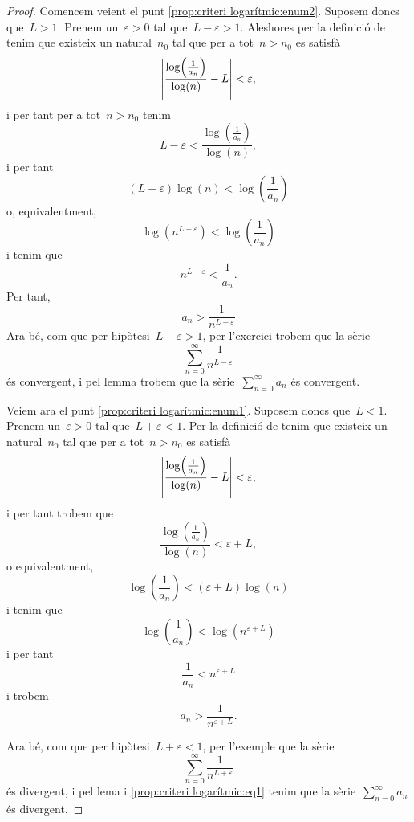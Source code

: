 \documentclass[../../main.tex]{subfiles}
\begin{document}
    \begin{proof}
        Comencem veient el punt \eqref{prop:criteri logarítmic:enum2}.
        Suposem doncs que~\(L>1\).
        Prenem un~\(\varepsilon>0\) tal que~\(L-\varepsilon>1\).
        Aleshores per la definició de  tenim que existeix un natural~\(n_{0}\) tal que per a tot~\(n>n_{0}\) es satisfà
        \[
            \abs{\frac{\log\left(\frac{1}{a_{n}}\right)}{\log(n)}-L}<\varepsilon,
        \]
        i per tant per a tot~\(n>n_{0}\) tenim
        \[
            L-\varepsilon<\frac{\log\left(\frac{1}{a_{n}}\right)}{\log(n)},
        \]
        i per tant
        \[
            (L-\varepsilon)\log(n)<\log\left(\frac{1}{a_{n}}\right)
        \]
        o, equivalentment,
        \[
            \log\left(n^{L-\varepsilon}\right)<\log\left(\frac{1}{a_{n}}\right)
        \]
        i tenim que %
        \[
            n^{L-\varepsilon}<\frac{1}{a_{n}}.
        \]
        Per tant,
        \[
            a_{n}>\frac{1}{n^{L-\varepsilon}}
        \]
        Ara bé, com que per hipòtesi~\(L-\varepsilon>1\), per l'exercici  trobem que la sèrie
        \[
            \sum_{n=0}^{\infty}\frac{1}{n^{L-\varepsilon}}
        \]
        és convergent, i pel lemma  trobem que la sèrie~\(\sum_{n=0}^{\infty}a_{n}\) és convergent.

        Veiem ara el punt \eqref{prop:criteri logarítmic:enum1}.
        Suposem doncs que~\(L<1\).
        Prenem un~\(\varepsilon>0\) tal que~\(L+\varepsilon<1\).
        Per la definició de  tenim que existeix un natural~\(n_{0}\) tal que per a tot~\(n>n_{0}\) es satisfà
        \[
            \abs{\frac{\log\left(\frac{1}{a_{n}}\right)}{\log(n)}-L}<\varepsilon,
        \]
        i per tant trobem que
        \[
            \frac{\log\left(\frac{1}{a_{n}}\right)}{\log(n)}<\varepsilon+L,
        \]
        o equivalentment,
        \[
            \log\left(\frac{1}{a_{n}}\right)<(\varepsilon+L)\log(n)
        \]
        i tenim que
        \[
            \log\left(\frac{1}{a_{n}}\right)<\log\left(n^{\varepsilon+L}\right)
        \]
        i per tant
        \[
            \frac{1}{a_{n}}<n^{\varepsilon+L}
        \]
        i trobem
        \begin{equation}
            \label{prop:criteri logarítmic:eq1}
            a_{n}>\frac{1}{n^{\varepsilon+L}}.
        \end{equation}

        Ara bé, com que per hipòtesi~\(L+\varepsilon<1\), per l'exemple  que la sèrie
        \[
            \sum_{n=0}^{\infty}\frac{1}{n^{L+\varepsilon}}
        \]
        és divergent, i pel lema  i \eqref{prop:criteri logarítmic:eq1} tenim que la sèrie~\(\sum_{n=0}^{\infty}a_{n}\) és divergent.
    \end{proof}
\end{document}
